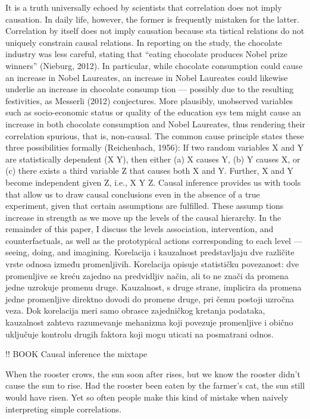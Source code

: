 \documentclass[12pt, a4paper]{article}
\begin{document}
 It is a truth universally echoed by scientists that correlation
 does not imply causation. In daily life, however, the former is
 frequently mistaken for the latter.
  Correlation by itself does not imply causation because sta
tistical relations do not uniquely constrain causal relations.
In reporting on the study, the chocolate industry
 was less careful, stating that “eating chocolate produces Nobel
 prize winners” (Nieburg, 2012).
 In particular, while chocolate consumption could cause an
 increase in Nobel Laureates, an increase in Nobel Laureates
 could likewise underlie an increase in chocolate consump
tion — possibly due to the resulting festivities, as Messerli
 (2012) conjectures. More plausibly, unobserved variables
 such as socio-economic status or quality of the education sys
tem might cause an increase in both chocolate consumption
 and Nobel Laureates, thus rendering their correlation spurious,
 that is, non-causal. The common cause principle states these
 three possibilities formally (Reichenbach, 1956):
  If two random variables X and Y are statistically
 dependent (X Y), then either (a) X causes Y,
 (b) Y causes X, or (c) there exists a third variable
 Z that causes both X and Y. Further, X and Y
 become independent given Z, i.e., X Y Z.
 Causal inference provides us with tools that allow us to draw
 causal conclusions even in the absence of a true experiment,
 given that certain assumptions are fulfilled. These assump
tions increase in strength as we move up the levels of the
 causal hierarchy. In the remainder of this paper, I discuss
 the levels association, intervention, and counterfactuals, as
 well as the prototypical actions corresponding to each level —
 seeing, doing, and imagining.  
 Korelacija i kauzalnost predstavljaju dve različite vrste odnosa između promenljivih. Korelacija opisuje statističku povezanost: dve promenljive se kreću zajedno na predvidljiv način, ali to ne znači da promena jedne uzrokuje promenu druge. Kauzalnost, s druge strane, implicira da promena jedne promenljive direktno dovodi do promene druge, pri čemu postoji uzročna veza. Dok korelacija meri samo obrasce zajedničkog kretanja podataka, kauzalnost zahteva razumevanje mehanizma koji povezuje promenljive i obično uključuje kontrolu drugih faktora koji mogu uticati na posmatrani odnos.

!! BOOK Causal inference the mixtape 

 When the rooster crows, the sun soon after rises, but we know the rooster didn’t cause the sun to rise. Had the rooster been eaten by the farmer’s cat, the sun still would have risen. Yet so often people make this kind of mistake when naively interpreting simple correlations.
    
\end{document}
